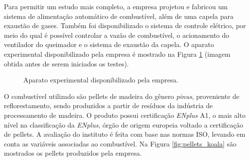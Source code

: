 Para permitir um estudo mais completo, a empresa projetou e fabricou um sistema de alimentação automático de combustível, além de uma capela para exaustão de gases. Também foi disponibilizado o sistema de controle elétrico, por meio do qual é possível controlar a vazão de combustível, o acionamento do ventilador do queimador e o sistema de exaustão da capela. O aparato experimental disponibilizado pela empresa é mostrado na Figura \ref{fig:aparatokoala} (imagem obtida antes de serem iniciados os testes).

\begin{figure}
	\centering
	\caption{Aparato experimental disponibilizado pela empresa.}
	\label{fig:aparatokoala}
\end{figure}

O combustível utilizado são pellets de madeira do gênero \textit{pinus}, proveniente de reflorestamento, sendo produzidos a partir de resíduos da indústria de processamento de madeira. O produto possui certificação \textit{ENplus} A1, o mais alto nível na classificação da \textit{ENplus}, órgão de origem europeia voltado a certificação de pellets. A avaliação do instituto é feita com base nas normas ISO, levando em conta as variáveis associadas ao combustível. Na Figura \ref{fig:pellets_koala} são mostrados os pellets produzidos pela empresa.

